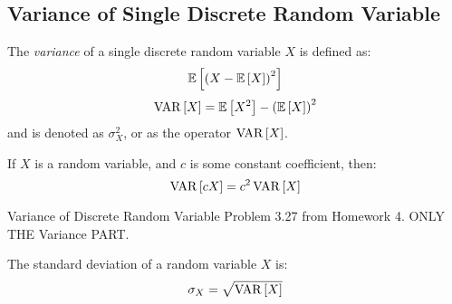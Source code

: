 	\subsection{Variance of Single Discrete Random Variable} \label{subsec:Variance of Single Discrete}
		\begin{definition}[Variance] \label{def:Variance of Single Discrete}
			The \emph{variance} of a single discrete random variable $X$ is defined as:
			\begin{equation} \label{eq:Variance of Single Discrete-Form 1}
				\operatorname{\operatorname{\mathbb{E}}} \left[ \left( X - \operatorname{\operatorname{\mathbb{E}}} \left[ X \right] \right)^{2} \right]
			\end{equation}
			\begin{equation} \label{eq:Variance of Single Discrete-Form 2}
				\operatorname{\operatorname{VAR}} \left[ X \right] = \operatorname{\operatorname{\mathbb{E}}} \left[ X^{2} \right] - \left( \operatorname{\operatorname{\mathbb{E}}} \left[ X \right] \right)^{2}
			\end{equation}
			and is denoted as $\sigma_{X}^{2}$, or as the operator $\operatorname{\operatorname{VAR}} \left[ X \right]$.
			\begin{remark} \label{rmk:Constant in Variance}
				If $X$ is a random variable, and $c$ is some constant coefficient, then:
				\begin{equation}
					\operatorname{\operatorname{VAR}} \left[ cX \right] = c^{2} \operatorname{\operatorname{VAR}} \left[ X \right]
				\end{equation}
			\end{remark}
		\end{definition}
		\begin{example}[Problem 3.27]{Variance of Discrete Random Variable}
			Problem 3.27 from Homework 4. ONLY THE Variance PART.
		\end{example}
		\begin{definition} \label{def:Standard Deviation}
			The standard deviation of a random variable $X$ is:
			\begin{equation} \label{eq:Standard Deviation}
				\sigma_{X} = \sqrt{\operatorname{\operatorname{VAR}} \left[ X \right]}
			\end{equation}
		\end{definition}
	
